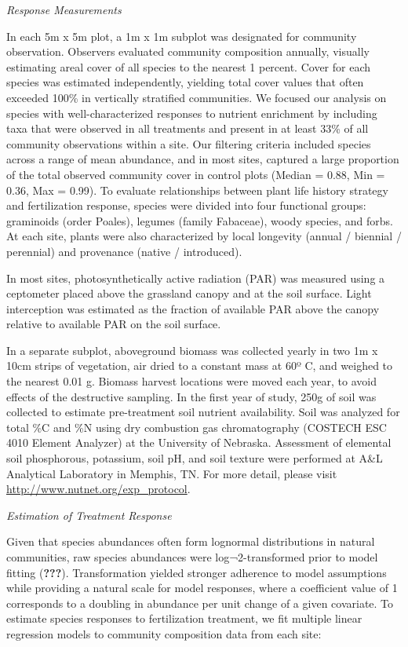 \documentclass[twoside,12pt,final]{ucthesis-CA2012}
\begin{document}
\begin{ucmainmatter}
\emph{Response Measurements}

In each 5m x 5m plot, a 1m x 1m subplot was designated for community observation. Observers evaluated community composition annually, visually estimating areal cover of all species to the nearest 1 percent. Cover for each species was estimated independently, yielding total cover values that often exceeded 100\% in vertically stratified communities. We focused our analysis on species with well-characterized responses to nutrient enrichment by including taxa that were observed in all treatments and present in at least 33\% of all community observations within a site. Our filtering criteria included species across a range of mean abundance, and in most sites, captured a large proportion of the total observed community cover in control plots (Median = 0.88, Min = 0.36, Max = 0.99).
To evaluate relationships between plant life history strategy and fertilization response, species were divided into four functional groups: graminoids (order Poales), legumes (family Fabaceae), woody species, and forbs. At each site, plants were also characterized by local longevity (annual / biennial / perennial) and provenance (native / introduced).

In most sites, photosynthetically active radiation (PAR) was measured using a ceptometer placed above the grassland canopy and at the soil surface. Light interception was estimated as the fraction of available PAR above the canopy relative to available PAR on the soil surface.

In a separate subplot, aboveground biomass was collected yearly in two 1m x 10cm strips of vegetation, air dried to a constant mass at 60º C, and weighed to the nearest 0.01 g. Biomass harvest locations were moved each year, to avoid effects of the destructive sampling. In the first year of study, 250g of soil was collected to estimate pre-treatment soil nutrient availability. Soil was analyzed for total \%C and \%N using dry combustion gas chromatography (COSTECH ESC 4010 Element Analyzer) at the University of Nebraska. Assessment of elemental soil phosphorous, potassium, soil pH, and soil texture were performed at A\&L Analytical Laboratory in Memphis, TN. For more detail, please visit \url{http://www.nutnet.org/exp_protocol}.

\emph{Estimation of Treatment Response}

Given that species abundances often form lognormal distributions in natural communities, raw species abundances were log¬2-transformed prior to model fitting ({\textbf{???}}). Transformation yielded stronger adherence to model assumptions while providing a natural scale for model responses, where a coefficient value of 1 corresponds to a doubling in abundance per unit change of a given covariate.
To estimate species responses to fertilization treatment, we fit multiple linear regression models to community composition data from each site:


\end{ucmainmatter}
\end{document}
